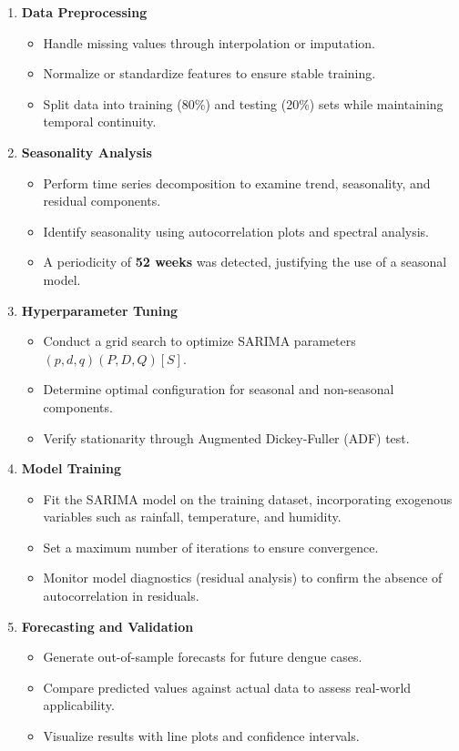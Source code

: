 \begin{enumerate}
	\item \textbf{Data Preprocessing}  
	\begin{itemize}
		\item Handle missing values through interpolation or imputation.
		\item Normalize or standardize features to ensure stable training.
		\item Split data into training (80\%) and testing (20\%) sets while maintaining temporal continuity.
	\end{itemize}
	
	\item \textbf{Seasonality Analysis}  
	\begin{itemize}
		\item Perform time series decomposition to examine trend, seasonality, and residual components.
		\item Identify seasonality using autocorrelation plots and spectral analysis.
		\item A periodicity of \textbf{52 weeks} was detected, justifying the use of a seasonal model.
	\end{itemize}
	
	\item \textbf{Hyperparameter Tuning}  
	\begin{itemize}
		\item Conduct a grid search to optimize SARIMA parameters $(p, d, q)(P, D, Q)[S]$.
		\item Determine optimal configuration for seasonal and non-seasonal components.
		\item Verify stationarity through Augmented Dickey-Fuller (ADF) test.
	\end{itemize}
	
	\item \textbf{Model Training}  
	\begin{itemize}
		\item Fit the SARIMA model on the training dataset, incorporating exogenous variables such as rainfall, temperature, and humidity.
		\item Set a maximum number of iterations to ensure convergence.
		\item Monitor model diagnostics (residual analysis) to confirm the absence of autocorrelation in residuals.
	\end{itemize}
	
	\item \textbf{Forecasting and Validation}  
	\begin{itemize}
		\item Generate out-of-sample forecasts for future dengue cases.
		\item Compare predicted values against actual data to assess real-world applicability.
		\item Visualize results with line plots and confidence intervals.
	\end{itemize}
	
\end{enumerate}








